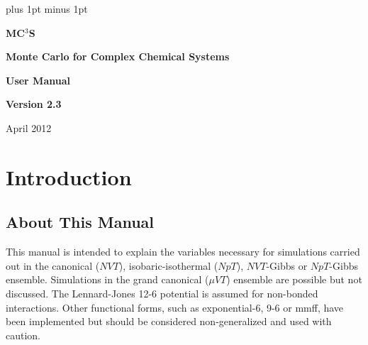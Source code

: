 \documentclass[12pt,letterpaper]{article}
\begin{document}
\parskip=6pt plus 1pt minus 1pt


\centerline{\bf \Huge MC$^3$S}

\vskip 24pt

\centerline{\bf \LARGE Monte Carlo for Complex Chemical Systems}

\vskip 24pt

\centerline{\bf \Large User Manual}

\vskip 24pt

\centerline{\bf \Large Version 2.3}

\vskip 36pt

\centerline{\large April 2012}

\eject

%
%
%
\section{Introduction}
\subsection{About This Manual}
\noindent This manual is intended to explain the variables necessary for
simulations carried out in the canonical ($NVT$), isobaric-isothermal
($NpT$), $NVT$-Gibbs or $NpT$-Gibbs ensemble.
Simulations in the grand canonical ($\mu VT$) ensemble are possible but not discussed.  
The Lennard-Jones 12-6 potential is assumed for non-bonded interactions.
Other functional forms, such as exponential-6, 9-6 or mmff, have been implemented
but should be considered non-generalized and used with caution.
\end{document}
